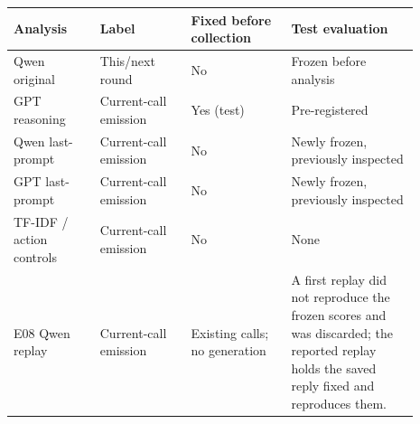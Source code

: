 \begin{tabular}{@{}>{\raggedright\arraybackslash}p{0.19\linewidth}>{\raggedright\arraybackslash}p{0.2\linewidth}>{\raggedright\arraybackslash}p{0.22\linewidth}>{\raggedright\arraybackslash}p{0.28\linewidth}@{}}
\toprule
Analysis & Label & Fixed before collection & Test evaluation \\
\midrule
Qwen original & This/next round & No & Frozen before analysis \\
GPT reasoning & Current-call emission & Yes (test) & Pre-registered \\
Qwen last-prompt & Current-call emission & No & Newly frozen, previously inspected \\
GPT last-prompt & Current-call emission & No & Newly frozen, previously inspected \\
TF-IDF / action controls & Current-call emission & No & None \\
E08 Qwen replay & Current-call emission & Existing calls; no generation & A first replay did not reproduce the frozen scores and was discarded; the reported replay holds the saved reply fixed and reproduces them. \\
\bottomrule
\end{tabular}
